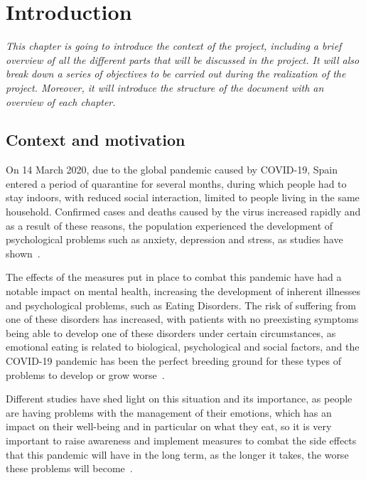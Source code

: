 \chapter{Introduction}
\label{chap:introduction}

\textit{
This chapter is going to introduce the context of the project, including a brief overview of all the different parts that will be discussed in the project. It will also break down a series of objectives to be carried out during the realization of the project. Moreover, it will introduce the structure of the document with an overview of each chapter.}



\clearpage

\section{Context and motivation}
\label{sec:context}



On 14 March 2020, due to the global pandemic caused by COVID-19, Spain entered a period of quarantine for several months, during which people had to stay indoors, with reduced social interaction, limited to people living in the same household. Confirmed cases and deaths caused by the virus increased rapidly and as a result of these reasons, the population experienced the development of psychological problems such as anxiety, depression and stress, as studies have shown~\cite{ramirez2021repercusiones}.

The effects of the measures put in place to combat this pandemic have had a notable impact on mental health, increasing the development of inherent illnesses and psychological problems, such as Eating Disorders. The risk of suffering from one of these disorders has increased, with patients with no preexisting symptoms being able to develop one of these disorders under certain circumstances, as emotional eating is related to biological, psychological and social factors, and the COVID-19 pandemic has been the perfect breeding ground for these types of problems to develop or grow worse~\cite{dos2022emotional}.

Different studies have shed light on this situation and its importance, as people are having problems with the management of their emotions, which has an impact on their well-being and in particular on what they eat, so it is very important to raise awareness and implement measures to combat the side effects that this pandemic will have in the long term, as the longer it takes, the worse these problems will become~\cite{touyz2020eating}.


